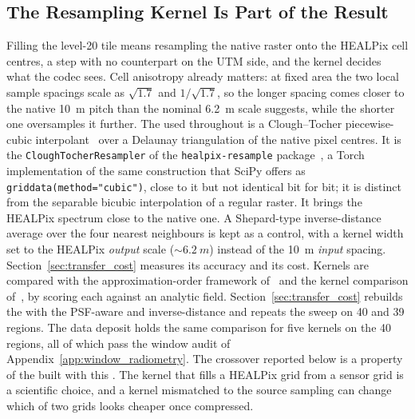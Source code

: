 \subsection{The Resampling Kernel Is Part of the Result}
\label{sec:resampler}
Filling the level-20 tile means resampling the native raster onto the
HEALPix cell centres, a step with no counterpart on the UTM side, and the
kernel decides what the codec sees. Cell anisotropy already matters: at
fixed area the two local sample spacings scale as $\sqrt{1.7}$ and
$1/\sqrt{1.7}$, so the longer spacing comes closer to the native
\SI{10}{m} pitch than the nominal \SI{6.2}{m} scale suggests, while the
shorter one oversamples it further. The
 used throughout is a Clough--Tocher piecewise-cubic
interpolant~\cite{clough1965plate} over a Delaunay triangulation of the
native pixel centres. It is the \texttt{CloughTocherResampler} of the
\texttt{healpix-resample} package~\cite{delouis2026resample}, a Torch
implementation of the same construction that SciPy offers as
\texttt{griddata(method="cubic")}, close to it but not identical bit for
bit; it is distinct from the separable bicubic interpolation of a regular
raster. It brings the HEALPix spectrum close to the native one. A Shepard-type
inverse-distance average over the four nearest neighbours is kept as a
control, with a kernel width set to the HEALPix \emph{output} scale
($\sim\SI{6.2}{m}$) instead of the \SI{10}{m} \emph{input} spacing. Section~\ref{sec:transfer_cost} measures its accuracy and its cost. Kernels are compared with the
approximation-order framework of~\cite{blu1999fourier} and the kernel
comparison of~\cite{thevenaz2000interpolation}, by scoring each against
an analytic field. Section~\ref{sec:transfer_cost} rebuilds the 
with the PSF-aware and inverse-distance  and repeats the sweep
on 40 and 39 regions. The data deposit holds the same comparison for five
kernels on the 40 regions, all of which pass the window audit of
Appendix~\ref{app:window_radiometry}. The crossover reported
below is a property of the  built with this . The kernel
that fills a HEALPix grid from a sensor grid is a scientific choice, and
a kernel mismatched to the source sampling can change which of two grids
looks cheaper once compressed.

